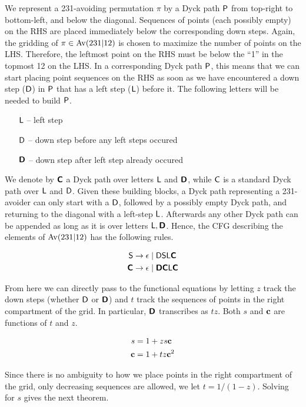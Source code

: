 \documentclass[12pt, a4paper, twoside]{report}
\begin{document}
We represent a 231-avoiding permutation $\pi$ by a Dyck path $\textsf{P}$ from top-right to bottom-left, and below the diagonal. Sequences of points (each possibly empty) on the RHS are placed immediately below the corresponding down steps. Again, the gridding of $\pi \in \mathrm{Av}(231|12)$ is chosen to maximize the number of points on the LHS. Therefore, the leftmost point on the RHS must be below the ``1'' in the topmost 12 on the LHS. In a corresponding Dyck path $\textsf{P}$, this means that we can start placing point sequences on the RHS as soon as we have encountered a down step ($\mathsf{D}$) in $\textsf{P}$ that has a left step ($\mathsf{L}$) before it. The following letters will be needed to build $\textsf{P}$. 
\begin{enumerate}
\item[$\mathsf{L}$ --] left step
\item[$\mathsf{D}$ --] down step before any left steps occured
\item[$\textbf{\textsf{D}}$ --] down step after left step already occured
\end{enumerate}

We denote by $\textbf{\textsf{C}}$ a Dyck path over letters $\mathsf{L}$ and $\textbf{\textsf{D}}$, while $\mathsf{C}$ is a standard Dyck path over $\mathsf{L}$ and $\mathsf{D}$. Given these building blocks, a Dyck path representing a 231-avoider can only start with a $\mathsf{D}$, followed by a possibly empty Dyck path, and returning to the diagonal with a left-step $\mathsf{L}$. Afterwards any other Dyck path can be appended as long as it is over letters $\mathsf{L}, \textbf{\textsf{D}}$. Hence, the CFG describing the elements of $\mathrm{Av}(231|12)$ has the following rules.

\begin{align*}
\mathsf{S} &\to \epsilon \mid \mathsf{D}\mathsf{S}\mathsf{L}\textbf{\textsf{C}}\\
\textbf{\textsf{C}} &\to \epsilon \mid \textbf{\textsf{D}}\textbf{\textsf{C}}\mathsf{L}\textbf{\textsf{C}}
\end{align*}

From here we can directly pass to the functional equations by letting $z$ track the down steps (whether $\mathsf{D}$ or $\textbf{\textsf{D}}$) and $t$ track the sequences of points in the right compartment of the grid. In particular, $\textbf{\textsf{D}}$ transcribes as $tz$. Both $s$ and $\mathbf{c}$ are functions of $t$ and $z$.

\begin{align*}
s &= 1 + zs\mathbf{c}\\
\mathbf{c} &= 1 + tz\mathbf{c}^2
\end{align*}

Since there is no ambiguity to how we place points in the right compartment of the grid, only decreasing sequences are allowed, we let $t = 1/(1-z)$. Solving for $s$ gives the next theorem. 
\end{document}
